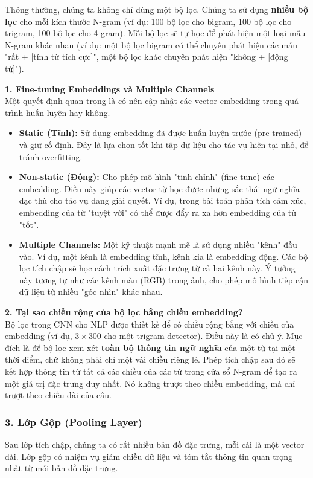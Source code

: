 Thông thường, chúng ta không chỉ dùng một bộ lọc. Chúng ta sử dụng \textbf{nhiều bộ lọc} cho mỗi kích thước N-gram (ví dụ: 100 bộ lọc cho bigram, 100 bộ lọc cho trigram, 100 bộ lọc cho 4-gram). Mỗi bộ lọc sẽ tự học để phát hiện một loại mẫu N-gram khác nhau (ví dụ: một bộ lọc bigram có thể chuyên phát hiện các mẫu "rất + [tính từ tích cực]", một bộ lọc khác chuyên phát hiện "không + [động từ]").
\begin{tcolorbox}[
    title=Ghi chú sâu về Lớp Nhúng và Tích chập,
    colback=green!5!white, colframe=green!50!black, fonttitle=\bfseries
]
\textbf{1. Fine-tuning Embeddings và Multiple Channels} \\
Một quyết định quan trọng là có nên cập nhật các vector embedding trong quá trình huấn luyện hay không.
\begin{itemize}
    \item \textbf{Static (Tĩnh):} Sử dụng embedding đã được huấn luyện trước (pre-trained) và giữ cố định. Đây là lựa chọn tốt khi tập dữ liệu cho tác vụ hiện tại nhỏ, để tránh overfitting.
    \item \textbf{Non-static (Động):} Cho phép mô hình "tinh chỉnh" (fine-tune) các embedding. Điều này giúp các vector từ học được những sắc thái ngữ nghĩa đặc thù cho tác vụ đang giải quyết. Ví dụ, trong bài toán phân tích cảm xúc, embedding của từ "tuyệt vời" có thể được đẩy ra xa hơn embedding của từ "tốt".
    \item \textbf{Multiple Channels:} Một kỹ thuật mạnh mẽ là sử dụng nhiều "kênh" đầu vào. Ví dụ, một kênh là embedding tĩnh, kênh kia là embedding động. Các bộ lọc tích chập sẽ học cách trích xuất đặc trưng từ cả hai kênh này. Ý tưởng này tương tự như các kênh màu (RGB) trong ảnh, cho phép mô hình tiếp cận dữ liệu từ nhiều "góc nhìn" khác nhau.
\end{itemize}

\textbf{2. Tại sao chiều rộng của bộ lọc bằng chiều embedding?} \\
Bộ lọc trong CNN cho NLP được thiết kế để có chiều rộng bằng với chiều của embedding (ví dụ, $3 \times 300$ cho một trigram detector). Điều này là có chủ ý. Mục đích là để bộ lọc xem xét \textbf{toàn bộ thông tin ngữ nghĩa} của một từ tại một thời điểm, chứ không phải chỉ một vài chiều riêng lẻ. Phép tích chập sau đó sẽ kết hợp thông tin từ tất cả các chiều của các từ trong cửa sổ N-gram để tạo ra một giá trị đặc trưng duy nhất. Nó không trượt theo chiều embedding, mà chỉ trượt theo chiều dài của câu.
\end{tcolorbox}
\subsubsection{3. Lớp Gộp (Pooling Layer)}
Sau lớp tích chập, chúng ta có rất nhiều bản đồ đặc trưng, mỗi cái là một vector dài. Lớp gộp có nhiệm vụ giảm chiều dữ liệu và tóm tắt thông tin quan trọng nhất từ mỗi bản đồ đặc trưng.

